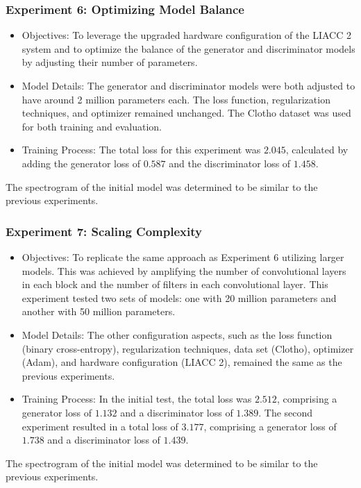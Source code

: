 \begin{frame}
    \frametitle{Experiment 6: Optimizing Model Balance}

    \begin{itemize}
        \item Objectives: To leverage the upgraded hardware configuration of the LIACC 2 system and to optimize the balance of the generator and discriminator models by adjusting their number of parameters.
        \item Model Details: The generator and discriminator models were both adjusted to have around 2 million parameters each. The loss function, regularization techniques, and optimizer remained unchanged. The Clotho dataset was used for both training and evaluation.
        \item Training Process: The total loss for this experiment was $2.045$, calculated by adding the generator loss of $0.587$ and the discriminator loss of $1.458$.
    \end{itemize}

    The spectrogram of the initial model was determined to be similar to the previous experiments.
\end{frame}

\begin{frame}
    \frametitle{Experiment 7: Scaling Complexity}

    \begin{itemize}
        \item Objectives: To replicate the same approach as Experiment 6 utilizing larger models. This was achieved by amplifying the number of convolutional layers in each block and the number of filters in each convolutional layer. This experiment tested two sets of models: one with 20 million parameters and another with 50 million parameters.
        \item Model Details: The other configuration aspects, such as the loss function (binary cross-entropy), regularization techniques, data set (Clotho), optimizer (Adam), and hardware configuration (LIACC 2), remained the same as the previous experiments.
        \item Training Process: In the initial test, the total loss was $2.512$, comprising a generator loss of $1.132$ and a discriminator loss of $1.389$. The second experiment resulted in a total loss of $3.177$, comprising a generator loss of $1.738$ and a discriminator loss of $1.439$.
    \end{itemize}

    The spectrogram of the initial model was determined to be similar to the previous experiments.
\end{frame}

